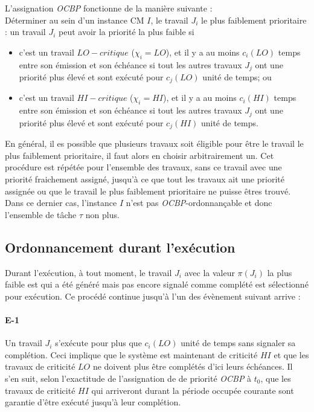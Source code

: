 \documentclass[12pt,a4paper,oneside]{book}
\theoremstyle{break}
\theoremstyle{breakplain}
\begin{document}
L'assignation \textit{OCBP} fonctionne de la manière suivante :\\
Déterminer au sein d'un instance CM $I$, le travail $J_i$ le plus faiblement prioritaire : un travail $J_i$ peut avoir la priorité la plus faible si
\begin{itemize}
\item c'est un travail $LO-critique$ ($\chi_i = LO$), et il y a au moins $c_i(LO)$ temps entre son émission et son échéance si tout les autres travaux $J_j$ ont une priorité plus élevé et sont exécuté pour $c_j(LO)$ unité de temps; ou
\item c'est un travail $HI-critique$ ($\chi_i = HI$), et il y a au moins $c_i(HI)$ temps entre son émission et son échéance si tout les autres travaux $J_j$ ont une priorité plus élevé et sont exécuté pour $c_j(HI)$ unité de temps.
\end{itemize}
En général, il es possible que plusieurs travaux soit éligible pour être le travail le plus faiblement prioritaire, il faut alors en choisir arbitrairement un. Cet procédure est répétée pour l'ensemble des travaux, sans ce travail avec une priorité fraichement assigné, jusqu'à ce que tout les travaux ait une priorité assignée ou que le travail le plus faiblement prioritaire ne puisse êtres trouvé. Dans ce dernier cas, l'instance $I$ n'est pas \textit{OCBP}-ordonnançable et donc l'ensemble de tâche $\tau$ non plus.

\subsection{Ordonnancement durant l'exécution}

Durant l'exécution, à tout moment, le travail $J_i$ avec la valeur $\pi(J_i)$ la plus faible est qui a été généré mais pas encore signalé comme complété est sélectionné pour exécution. Ce procédé continue jusqu'à l'un des évènement suivant arrive :

\paragraph{E-1}
Un travail $J_i$ s'exécute pour plus que $c_i(LO)$ unité de temps sans signaler sa complétion. Ceci implique que le système est maintenant de criticité $HI$ et que les travaux de criticité $LO$ ne doivent plus être complétés d'ici leurs échéances. Il s'en suit, selon l'exactitude de l'assignation de de priorité \textit{OCBP} à $t_0$, que les travaux de criticité $HI$ qui arriveront durant la période occupée courante sont garantie d'être exécuté jusqu'à leur complétion.
\end{document}
